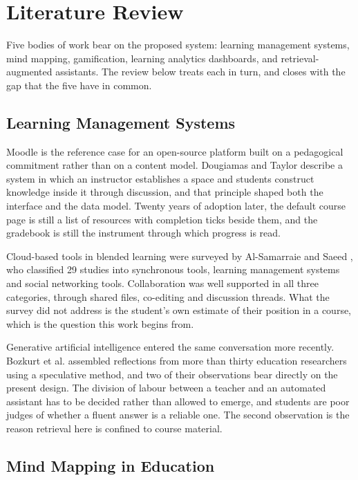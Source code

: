 \chapter{Literature Review}
\label{Literature_Review}

Five bodies of work bear on the proposed system: learning management systems, mind mapping, gamification, learning analytics dashboards, and retrieval-augmented assistants. The review below treats each in turn, and closes with the gap that the five have in common.

\section{Learning Management Systems}

Moodle is the reference case for an open-source platform built on a pedagogical commitment rather than on a content model. Dougiamas and Taylor \cite{dougiamas2004moodle} describe a system in which an instructor establishes a space and students construct knowledge inside it through discussion, and that principle shaped both the interface and the data model. Twenty years of adoption later, the default course page is still a list of resources with completion ticks beside them, and the gradebook is still the instrument through which progress is read.

Cloud-based tools in blended learning were surveyed by Al-Samarraie and Saeed \cite{alsamarraie2018systematic}, who classified 29 studies into synchronous tools, learning management systems and social networking tools. Collaboration was well supported in all three categories, through shared files, co-editing and discussion threads. What the survey did not address is the student's own estimate of their position in a course, which is the question this work begins from.

Generative artificial intelligence entered the same conversation more recently. Bozkurt et al. \cite{bozkurt2023speculative} assembled reflections from more than thirty education researchers using a speculative method, and two of their observations bear directly on the present design. The division of labour between a teacher and an automated assistant has to be decided rather than allowed to emerge, and students are poor judges of whether a fluent answer is a reliable one. The second observation is the reason retrieval here is confined to course material.

\section{Mind Mapping in Education}

